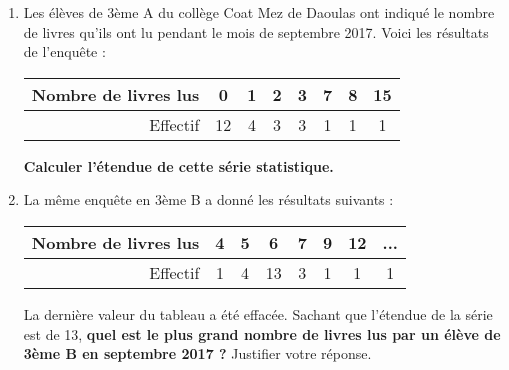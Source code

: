 
\begin{minipage}{0.99\linewidth}

\exo




\begin{enumerate}

\item Les élèves de 3ème A du collège Coat Mez de Daoulas ont indiqué le nombre de livres qu'ils ont lu pendant le mois de septembre 2017. Voici les résultats de l'enquête : 

\begin{center}

\begin{tabular}{|r|c|c|c|c|c|c|c|}
\hline 
Nombre de livres lus & 0 & 1 & 2 & 3 & 7 & 8 & 15 \\ 
\hline 
Effectif & 12 & 4 & 3 & 3 & 1 & 1 & 1 \\ 
\hline 
\end{tabular} 

\end{center}

\par 

\textbf{Calculer l'étendue de cette série statistique.}

\item La même enquête en 3ème B a donné les résultats suivants : 

\begin{center}

\begin{tabular}{|r|c|c|c|c|c|c|c|}
\hline 
Nombre de livres lus & 4 & 5 & 6 & 7 & 9 & 12 & ... \\ 
\hline 
Effectif & 1 & 4 & 13 & 3 & 1 & 1 & 1 \\ 
\hline
\end{tabular} 
\end{center}

\par

La dernière valeur du tableau a été effacée. Sachant que l'étendue de la série est de 13,\textbf{ quel est le plus grand nombre de livres lus par un élève de 3ème B en septembre 2017 ?}  Justifier votre réponse.


\end{enumerate}


\end{minipage}

\vspace{0.5cm}

